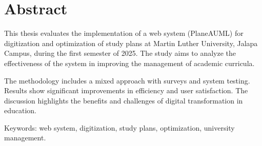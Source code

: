 \section*{\centering Abstract}

This thesis evaluates the implementation of a web system (PlaneAUML) for digitization and optimization of study plans at Martin Luther University, Jalapa Campus, during the first semester of 2025. The study aims to analyze the effectiveness of the system in improving the management of academic curricula.

The methodology includes a mixed approach with surveys and system testing. Results show significant improvements in efficiency and user satisfaction. The discussion highlights the benefits and challenges of digital transformation in education.

Keywords: web system, digitization, study plans, optimization, university management.